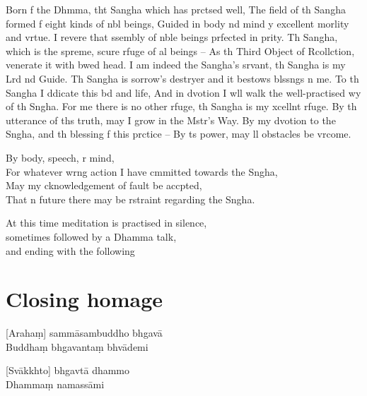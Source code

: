 Born f the Dhmma, tht Sangha which has prctsed well,
The field of th Sangha formed f eight kinds of nbl beings,
Guided in body nd mind y excellent morlity and vrtue.
I revere that ssembly of nble beings prfected in prity.
Th Sangha, which is the spreme, scure rfuge of al beings --
As th Third Object of Rcollction,  venerate it with bwed head.
I am indeed the Sangha's srvant, th Sangha is my Lrd nd Guide.
Th Sangha is sorrow's destryer and it bestows blssngs n me.
To th Sangha I ddicate this bd and life,
And in dvotion I wll walk the well-practised wy of th Sngha.
For me there is no other rfuge, th Sangha is my xcellnt rfuge.
By th utterance of ths truth, may I grow in the Mstr's Way.
By my dvotion to the Sngha, and th blessing f this prctice --
By ts power, may ll obstacles be vrcome.


By body, speech, r mind,\\
For whatever wrng action I have cmmitted towards the Sngha,\\
May my cknowledgement of fault be accpted,\\
That n future there may be rstraint regarding the Sngha.

\begin{instr}
  At this time meditation is practised in silence,\\
  sometimes followed by a Dhamma talk,\\
  and ending with the following
\end{instr}

\chapter{Closing homage}

[Arahaṃ] sammāsambuddho bhgavā\\
Buddhaṃ bhgavantaṃ bhvādemi


[Svākkhto] bhgavtā dhammo\\
Dhammaṃ namassāmi

